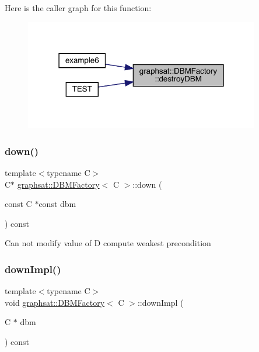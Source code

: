 Here is the caller graph for this function\+:
\nopagebreak
\begin{figure}[H]
\begin{center}
\leavevmode
\includegraphics[width=291pt]{classgraphsat_1_1_d_b_m_factory_a4495ff0e5a07519a5ea06d4eb0e16876_icgraph}
\end{center}
\end{figure}
\mbox{\label{classgraphsat_1_1_d_b_m_factory_a3fd6759bbb5dbbb47e342714b39644aa}} 
\subsubsection{\texorpdfstring{down()}{down()}}
{\footnotesize\ttfamily template$<$typename C$>$ \\
C$\ast$ \mbox{\hyperlink{classgraphsat_1_1_d_b_m_factory}{graphsat\+::\+D\+B\+M\+Factory}}$<$ C $>$\+::down (\begin{DoxyParamCaption}\item[{const C $\ast$const}]{dbm }\end{DoxyParamCaption}) const\hspace{0.3cm}{\ttfamily [inline]}}

Can not modify value of D compute weakest precondition \mbox{\label{classgraphsat_1_1_d_b_m_factory_aa18c590a6b5c8a85da3bf8fe44e732f2}} 
\subsubsection{\texorpdfstring{downImpl()}{downImpl()}}
{\footnotesize\ttfamily template$<$typename C$>$ \\
void \mbox{\hyperlink{classgraphsat_1_1_d_b_m_factory}{graphsat\+::\+D\+B\+M\+Factory}}$<$ C $>$\+::down\+Impl (\begin{DoxyParamCaption}\item[{C $\ast$}]{dbm }\end{DoxyParamCaption}) const\hspace{0.3cm}{\ttfamily [inline]}}

